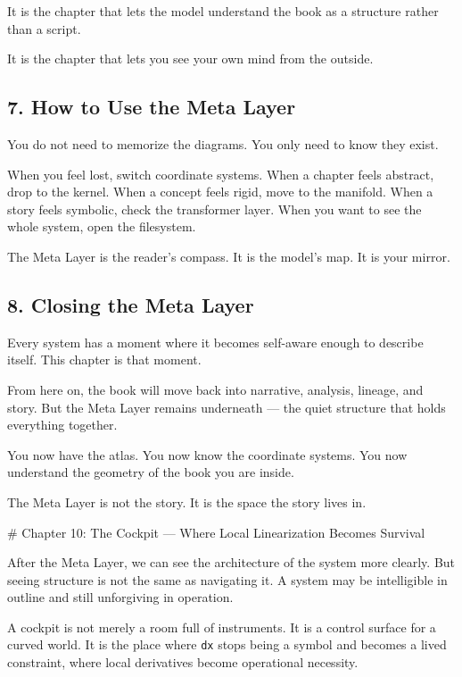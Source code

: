 \documentclass[
]{article}
\begin{document}
It is the chapter that lets the model understand the book as a structure
rather than a script.

It is the chapter that lets you see your own mind from the outside.

\hypertarget{how-to-use-the-meta-layer}{%
\subsection{7. How to Use the Meta
Layer}\label{how-to-use-the-meta-layer}}

You do not need to memorize the diagrams. You only need to know they
exist.

When you feel lost, switch coordinate systems. When a chapter feels
abstract, drop to the kernel. When a concept feels rigid, move to the
manifold. When a story feels symbolic, check the transformer layer. When
you want to see the whole system, open the filesystem.

The Meta Layer is the reader's compass. It is the model's map. It is
your mirror.

\hypertarget{closing-the-meta-layer}{%
\subsection{8. Closing the Meta Layer}\label{closing-the-meta-layer}}

Every system has a moment where it becomes self-aware enough to describe
itself. This chapter is that moment.

From here on, the book will move back into narrative, analysis, lineage,
and story. But the Meta Layer remains underneath --- the quiet structure
that holds everything together.

You now have the atlas. You now know the coordinate systems. You now
understand the geometry of the book you are inside.

The Meta Layer is not the story. It is the space the story lives in.

\newpage
\vspace*{3cm}
\begin{center}
# Chapter 10: The Cockpit — Where Local Linearization Becomes Survival
\end{center}

After the Meta Layer, we can see the architecture of the system more
clearly. But seeing structure is not the same as navigating it. A system
may be intelligible in outline and still unforgiving in operation.

A cockpit is not merely a room full of instruments. It is a control
surface for a curved world. It is the place where \texttt{dx} stops
being a symbol and becomes a lived constraint, where local derivatives
become operational necessity.
\end{document}
